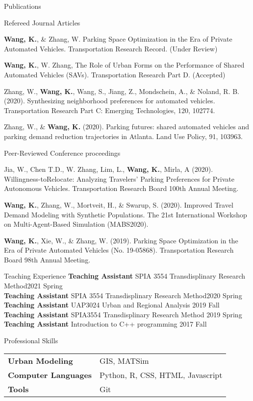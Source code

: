 \documentclass{resume} %
\begin{document}
\begin{rSection}{Publications}


\begin{rSubSection}{Refereed Journal Articles}

{\bf Wang, K.}, \& Zhang, W. Parking Space Optimization in the Era of Private Automated Vehicles. Transportation Research Record. (Under Review)

{\bf Wang, K.}, W. Zhang, The Role of Urban Forms on the Performance of Shared Automated Vehicles (SAVs). Transportation Research Part D. (Accepted)

Zhang, W., {\bf Wang, K.}, Wang, S., Jiang, Z., Mondschein, A., \& Noland, R. B. (2020). Synthesizing neighborhood preferences for automated vehicles. Transportation Research Part C: Emerging Technologies, 120, 102774.

Zhang, W., \& {\bf Wang, K.} (2020). Parking futures: shared automated vehicles and parking demand reduction trajectories in Atlanta. Land Use Policy, 91, 103963.

\end{rSubSection}


\begin{rSubSection}{Peer-Reviewed Conference proceedings}

Jia, W., Chen T.D., W. Zhang, Lim, L., {\bf Wang, K.}, Mirla, A (2020). Willingness-toRelocate: Analyzing Travelers' Parking Preferences for Private Autonomous Vehicles. Transportation Research Board 100th Annual Meeting.

{\bf Wang, K.}, Zhang, W., Mortveit, H., \& Swarup, S. (2020). Improved Travel Demand Modeling with Synthetic Populations. The 21st International Workshop on Multi-Agent-Based Simulation (MABS2020).

{\bf Wang, K.}, Xie, W., \& Zhang, W. (2019). Parking Space Optimization in the Era of Private Automated Vehicles (No. 19-05868). Transportation Research Board 98th Annual Meeting.


\end{rSubSection}

\end{rSection}


\begin{rSection}{Teaching Experience}
{\bf Teaching Assistant} SPIA 3554 Transdisplinary Research Method\hfill {2021 Spring}\\
{\bf Teaching Assistant} SPIA 3554 Transdisplinary Research Method\hfill {2020 Spring}\\
{\bf Teaching Assistant} UAP3024 Urban and Regional Analysis \hfill {2019 Fall}\\
{\bf Teaching Assistant} SPIA3554 Transdisplinary Research Method \hfill {2019 Spring}\\
{\bf Teaching Assistant} Introduction to C++ programming \hfill {2017 Fall}\\

\end{rSection}

\begin{rSection}{Professional Skills}
\begin{tabular}{ @{} >{\bfseries}l @{\hspace{6ex}} l }
Urban Modeling & GIS, MATSim\\
Computer Languages & Python, R, CSS, HTML, Javascript \\
Tools & Git\\
\end{tabular}
\end{rSection}
\end{document}
